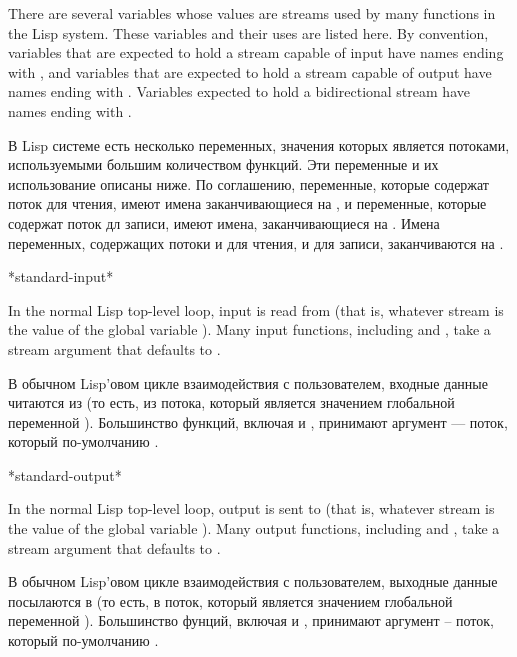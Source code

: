 There are several variables whose values are streams used by many
functions in the Lisp system.  These variables and their uses are
listed here.  By convention, variables that are expected to hold a
stream capable of input have names ending with , and
variables that are expected to hold a
stream capable of output have names ending with .
Variables expected to hold a
bidirectional stream have names ending with .

В Lisp системе есть несколько переменных, значения которых является потоками,
используемыми большим количеством функций. Эти переменные и их использование
описаны ниже. По соглашению, переменные, которые содержат поток для чтения,
имеют имена заканчивающиеся на , и переменные, которые содержат поток
дл записи, имеют имена, заканчивающиеся на .
Имена переменных, содержащих потоки и для чтения, и для записи, заканчиваются на
.

\begin{defun}[Variable]
*standard-input*

In the normal Lisp top-level loop, input is read from
 (that is, whatever stream is the value of the global
variable ).  Many input functions, including
 and , take a stream argument that defaults to
.

В обычном Lisp'овом цикле взаимодействия с пользователем, входные данные
читаются из  (то есть, из потока, который является
значением глобальной переменной ). Большинство функций,
включая  и , принимают аргумент --- поток, который
по-умолчанию . 
\end{defun}

\begin{defun}[Variable]
*standard-output*

In the normal Lisp top-level loop, output is sent to
 (that is, whatever stream is the value of the global
variable ).  Many output functions, including
 and , take a stream argument that defaults
to .

В обычном Lisp'овом цикле взаимодействия с пользователем, выходные данные
посылаются в  (то есть, в поток, который является
значением глобальной переменной ). Большинство фунций,
включая  и , принимают аргумент -- поток, который
по-умолчанию .
\end{defun}


